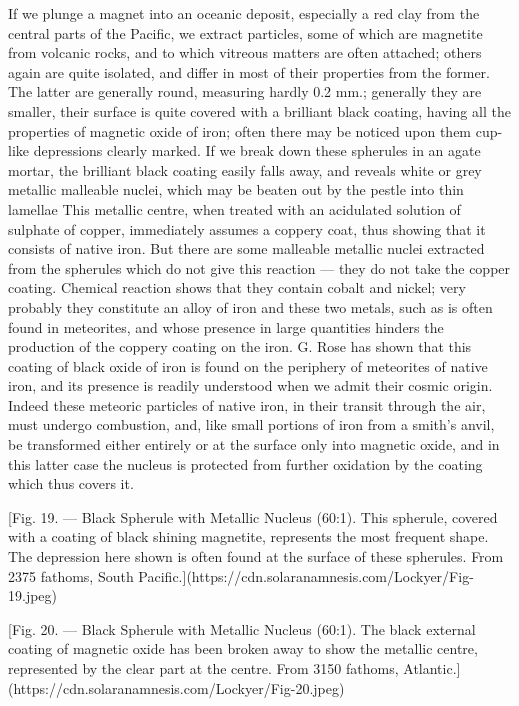 \documentclass[a4paper, 12pt, oneside, polutonikogreek, english]{article}
\begin{document}
If we plunge a magnet into an oceanic deposit, especially a red clay from the central parts of the Pacific, we extract particles, some of which are magnetite from volcanic rocks, and to which vitreous matters are often attached; others again are quite isolated, and differ in most of their properties from the former. The latter are generally round, measuring hardly 0.2 mm.; generally they are smaller, their surface is quite covered with a brilliant black coating, having all the properties of magnetic oxide of iron; often there may be noticed upon them cup-like depressions clearly marked. If we break down these spherules in an agate mortar, the brilliant black coating easily falls away, and reveals white or grey metallic malleable nuclei, which may be beaten out by the pestle into thin lamellae This metallic centre, when treated with an acidulated solution of sulphate of copper, immediately assumes a coppery coat, thus showing that it consists of native iron. But there are some malleable metallic nuclei extracted from the spherules which do not give this reaction --- they do not take the copper coating. Chemical reaction shows that they contain cobalt and nickel; very probably they constitute an alloy of iron and these two metals, such as is often found in meteorites, and whose presence in large quantities hinders the production of the coppery coating on the iron. G. Rose has shown that this coating of black oxide of iron is found on the periphery of meteorites of native iron, and its presence is readily understood when we admit their cosmic origin. Indeed these meteoric particles of native iron, in their transit through the air, must undergo combustion, and, like small portions of iron from a smith's anvil, be transformed either entirely or at the surface only into magnetic oxide, and in this latter case the nucleus is protected from further oxidation by the coating which thus covers it.

[Fig. 19. --- Black Spherule with Metallic Nucleus (60:1). This spherule, covered with a coating of black shining magnetite, represents the most frequent shape. The depression here shown is often found at the surface of these spherules. From 2375 fathoms, South Pacific.](https://cdn.solaranamnesis.com/Lockyer/Fig-19.jpeg)

[Fig. 20. --- Black Spherule with Metallic Nucleus (60:1). The black external coating of magnetic oxide has been broken away to show the metallic centre, represented by the clear part at the centre. From 3150 fathoms, Atlantic.](https://cdn.solaranamnesis.com/Lockyer/Fig-20.jpeg)
\end{document}
